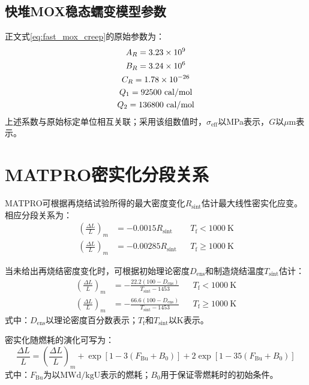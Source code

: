\subsection{快堆MOX稳态蠕变模型参数}

正文式\eqref{eq:fast_mox_creep}的原始参数为：
\begin{gather}
	A_R=3.23\times10^{9}
	\notag
	\\
	B_R=3.24\times10^{6}
	\notag
	\\
	C_R=1.78\times10^{-26}
	\notag
	\\
	Q_1=92500\ \mathrm{cal/mol}
	\notag
	\\
	Q_2=136800\ \mathrm{cal/mol}
	\label{eq:appendix_fast_mox_creep_parameters}
\end{gather}
上述系数与原始标定单位相互关联；采用该组数值时，$\sigma_{\mathrm{eff}}$以MPa表示，$G$以$\mu\mathrm{m}$表示。

\section{MATPRO密实化分段关系}
\label{app:mox_densification_correlations}

MATPRO可根据再烧结试验所得的最大密度变化$R_{\mathrm{sint}}$估计最大线性密实化应变。相应分段关系为：
\begin{equation}
	\begin{aligned}
		\left(\frac{\Delta L}{L}\right)_m
		&=-0.0015R_{\mathrm{sint}}
		&&T_{\mathrm f}<1000\ \mathrm{K}
		\\
		\left(\frac{\Delta L}{L}\right)_m
		&=-0.00285R_{\mathrm{sint}}
		&&T_{\mathrm f}\geq1000\ \mathrm{K}
	\end{aligned}
	\label{eq:appendix_densification_resintering}
\end{equation}
\label{eq:appendix_densification_resintering_lowT}
\label{eq:appendix_densification_resintering_highT}

当未给出再烧结密度变化时，可根据初始理论密度$D_{\mathrm{ens}}$和制造烧结温度$T_{\mathrm{sint}}$估计：
\begin{equation}
	\begin{aligned}
		\left(\frac{\Delta L}{L}\right)_m
		&=-\frac{22.2(100-D_{\mathrm{ens}})}
		{T_{\mathrm{sint}}-1453}
		&&T_{\mathrm f}<1000\ \mathrm{K}
		\\
		\left(\frac{\Delta L}{L}\right)_m
		&=-\frac{66.6(100-D_{\mathrm{ens}})}
		{T_{\mathrm{sint}}-1453}
		&&T_{\mathrm f}\geq1000\ \mathrm{K}
	\end{aligned}
	\label{eq:appendix_densification_sintering_temperature}
\end{equation}
\label{eq:appendix_densification_sintering_lowT}
\label{eq:appendix_densification_sintering_highT}
\noindent 式中：$D_{\mathrm{ens}}$以理论密度百分数表示；$T_{\mathrm f}$和$T_{\mathrm{sint}}$以K表示。

密实化随燃耗的演化可写为：
\begin{equation}
	\frac{\Delta L}{L}
	=\left(\frac{\Delta L}{L}\right)_m
	+\exp\!\left[1-3(F_{\mathrm{Bu}}+B_0)\right]
	+2\exp\!\left[1-35(F_{\mathrm{Bu}}+B_0)\right]
	\label{eq:appendix_matpro_densification_evolution}
\end{equation}
\noindent 式中：$F_{\mathrm{Bu}}$为以$\mathrm{MWd/kgU}$表示的燃耗；$B_0$用于保证零燃耗时的初始条件。
